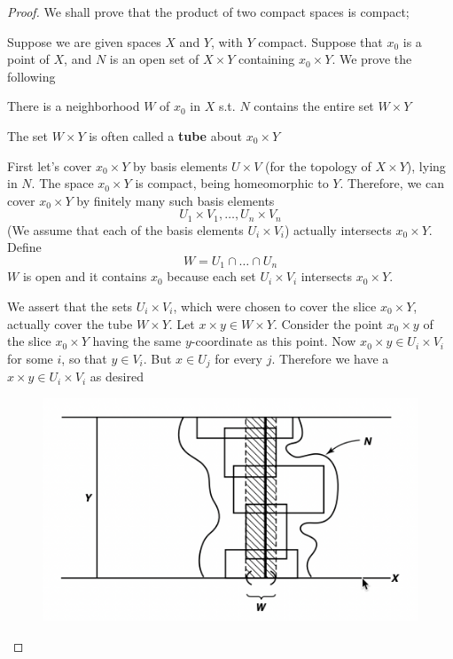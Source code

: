 \documentclass[11pt]{article}
\begin{document}
\begin{proof}
We shall prove that the product of two compact spaces is compact;

Suppose we are given spaces \(X\) and \(Y\), with \(Y\) compact. Suppose that \(x_0\) is a point
of \(X\), and \(N\) is an open set of \(X\times Y\) containing \(x_0\times Y\). We prove the following
\begin{quoting}
There is a neighborhood \(W\) of \(x_0\) in \(X\) s.t. \(N\) contains the entire set \(W\times Y\)
\end{quoting}

The set \(W\times Y\) is often called a \textbf{tube} about \(x_0\times Y\)

First let's cover \(x_0\times Y\) by basis elements \(U\times V\) (for the topology of \(X\times Y\)), lying
in \(N\). The space \(x_0\times Y\)  is compact, being homeomorphic to \(Y\). Therefore, we can
cover \(x_0\times Y\) by finitely many such basis elements
\begin{equation*}
U_1\times V_1,\dots,U_n\times V_n
\end{equation*}
(We assume that each of the basis elements \(U_i\times V_i\)) actually intersects \(x_0\times Y\). Define
\begin{equation*}
W=U_1\cap\dots\cap U_n
\end{equation*}
\(W\) is open and it contains \(x_0\) because each set \(U_i\times V_i\) intersects \(x_0\times Y\).

We assert that the sets \(U_i\times V_i\), which were chosen to cover the slice \(x_0\times Y\), actually
cover the tube \(W\times Y\). Let \(x\times y\in W\times Y\). Consider the point \(x_0\times y\) of the
slice \(x_0\times Y\) having the same \(y\)-coordinate as this point. Now \(x_0\times y\in U_i\times V_i\) for
some \(i\), so that \(y\in V_i\). But \(x\in U_j\) for every \(j\). Therefore we
have a\(x\times y\in U_i\times V_i\) as desired

\begin{figure}[htbp]
\centering
\includegraphics[width=.7\textwidth]{../images/Topology/6.png}
\label{}
\end{figure}


\end{proof}
\end{document}
